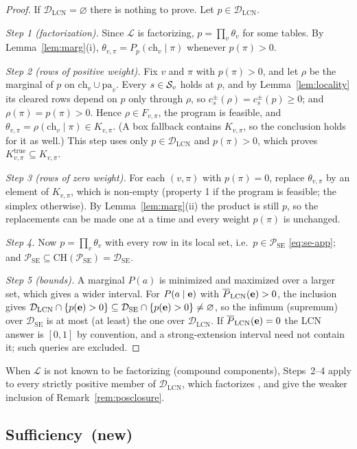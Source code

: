 \documentclass{article} %
\DeclareRobustCommand{\rev}[1]{{\color{blue}#1}}
\newcommand{\newtag}{\texorpdfstring{~\rev{(new)}}{}}
\newcommand{\hi}{\overline}
\newcommand{\DSE}{\mathcal{D}_{\mathrm{SE}}}
\newcommand{\DLCN}{\mathcal{D}_{\mathrm{LCN}}}
\newcommand{\ch}{\mathrm{ch}}
\newcommand{\pa}{\mathrm{pa}}
\begin{document}
\begin{proof}
If $\DLCN=\varnothing$ there is nothing to prove. Let $p\in\DLCN$.

\emph{Step 1 (factorization).} Since $\mathcal L$ is factorizing, $p=\prod_v\theta_v$ for some tables.
By Lemma~\ref{lem:marg}(i), $\theta_{v,\pi}=P_p(\ch_v\mid\pi)$ whenever $p(\pi)>0$.

\emph{Step 2 (rows of positive weight).} Fix $v$ and $\pi$ with $p(\pi)>0$, and let $\rho$ be the
marginal of $p$ on $\ch_v\cup\pa_v$. Every $s\in\mathcal{S}_v$ holds at $p$, and by Lemma~\ref{lem:locality}
its cleared rows depend on $p$ only through $\rho$, so $c_s^\pm(\rho)=c_s^\pm(p)\ge0$; and
$\rho(\pi)=p(\pi)>0$. Hence $\rho\in F_{v,\pi}$, the program is feasible, and
$\theta_{v,\pi}=\rho(\ch_v\mid\pi)\in K_{v,\pi}$. (A box fallback contains $K_{v,\pi}$, so the
conclusion holds for it as well.) This step uses only $p\in\DLCN$ and $p(\pi)>0$, which proves
$K^{\mathrm{true}}_{v,\pi}\subseteq K_{v,\pi}$.

\emph{Step 3 (rows of zero weight).} For each $(v,\pi)$ with $p(\pi)=0$, replace $\theta_{v,\pi}$ by an
element of $K_{v,\pi}$, which is non-empty (property 1 if the program is feasible; the simplex
otherwise). By Lemma~\ref{lem:marg}(ii) the product is still $p$, so the replacements can be made one
at a time and every weight $p(\pi)$ is unchanged.

\emph{Step 4.} Now $p=\prod_v\theta_v$ with every row in its local set, i.e.\
$p\in\mathcal P_{\mathrm{SE}}$ \eqref{eq:se-app}; and
$\mathcal P_{\mathrm{SE}}\subseteq\mathrm{CH}(\mathcal P_{\mathrm{SE}})=\DSE$.

\emph{Step 5 (bounds).} A marginal $P(a)$ is minimized and maximized over a larger set, which gives a
wider interval. For $P(a\mid\mathbf{e})$ with $\hi P_{\mathrm{LCN}}(\be)>0$, the inclusion gives
$\DLCN\cap\{p(\be)>0\}\subseteq\DSE\cap\{p(\be)>0\}\ne\varnothing$, so the infimum (supremum) over
$\DSE$ is at most (at least) the one over $\DLCN$. If $\hi P_{\mathrm{LCN}}(\be)=0$ the LCN answer is
$[0,1]$ by convention, and a strong-extension interval need not contain it; such queries are
excluded.
\end{proof}

When $\mathcal L$ is not known to be factorizing (compound components), Steps~2--4 apply to every
strictly positive member of $\DLCN$, which factorizes \citep{cozman23a}, and give the weaker inclusion
of Remark~\ref{rem:posclosure}.

\subsection{Sufficiency\newtag}
\end{document}
